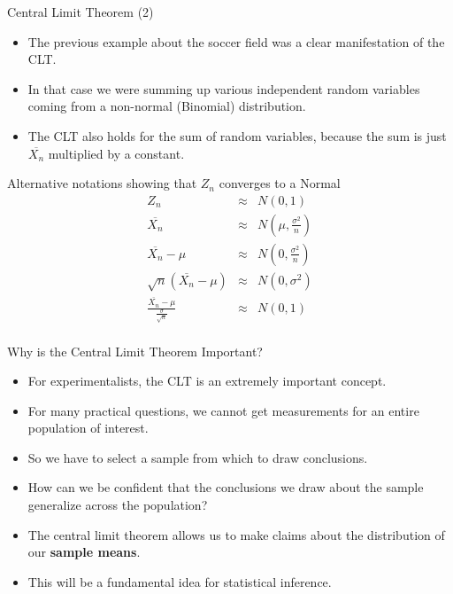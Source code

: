 \documentclass[handout]{beamer}
\begin{document}
\begin{frame}{Central Limit Theorem (2)}
\scriptsize{
\begin{itemize}
 \item The previous example about the soccer field was a clear manifestation of the CLT.
 \item In that case we were summing up various independent random variables coming from a non-normal (Binomial) distribution.
 \item The CLT also holds for the sum of random variables, because the sum is just $\overline{X_{n}}$ multiplied by a constant.
\end{itemize}



\begin{block}{Alternative notations showing that $Z_{n}$ converges to a Normal}
\begin{eqnarray*}
  Z_n  &\approx &N(0,1)     \nonumber \\
  \overline{X_{n}} & \approx & N \left(\mu, \frac{\sigma^2}{n} \right)   \nonumber \\
  \overline{X_{n}}-\mu & \approx & N \left(0, \frac{\sigma^2}{n} \right)   \nonumber \\
  \sqrt{n}(\overline{X_{n}}-\mu) & \approx & N (0,\sigma^2) \nonumber \\
  \frac{\overline{X_{n}}-\mu}{\frac{\sigma}{\sqrt{n}}} & \approx & N (0,1) \nonumber \\
\end{eqnarray*}


\end{block}


 }
\end{frame}


\begin{frame}{ Why is the Central Limit Theorem Important?}
\scriptsize{
\begin{itemize}
 \item For experimentalists, the CLT is an extremely important concept. 
 \item For many practical questions, we cannot get measurements for an entire population of interest.
 \item So we have to select a sample from which to draw conclusions. 
 \item How can we be confident that the conclusions we draw about the sample generalize across the population? 
 \item The central limit theorem allows us to make claims about the distribution of our \textbf{sample means}. 
 \item This will be a fundamental idea for statistical inference.
\end{itemize}


 }
\end{frame}
\end{document}
